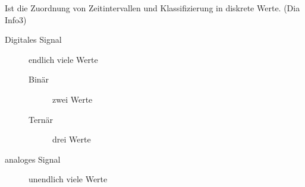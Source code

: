 Ist die Zuordnung von Zeitintervallen und Klassifizierung in diskrete Werte. (Dia Info3)

\begin{description}
\item[Digitales Signal] endlich viele Werte
\begin{description}
\item[Binär] zwei Werte
\item[Ternär] drei Werte
\end{description}
\item[analoges Signal] unendlich viele Werte
\end{description}